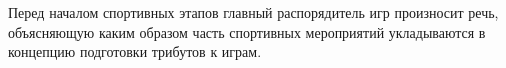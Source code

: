 
\par Перед началом спортивных этапов главный распорядитель игр произносит речь, объясняющую каким образом часть спортивных мероприятий укладываются в концепцию подготовки трибутов к играм.



